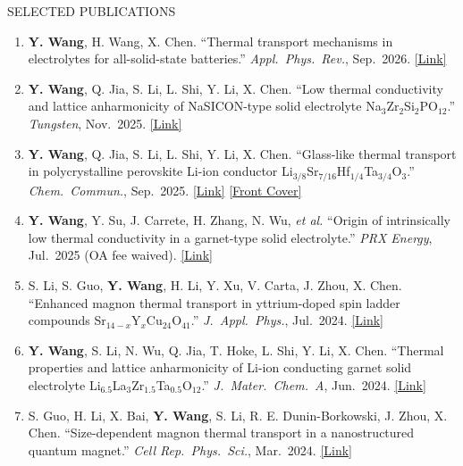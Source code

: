 \documentclass{resume} %
\begin{document}
\begin{rSection}{SELECTED PUBLICATIONS}
\begin{enumerate}
\itemsep 0.2em

\item \textbf{Y. Wang}, H. Wang, X. Chen.
``Thermal transport mechanisms in electrolytes for all-solid-state batteries.''
\textit{Appl.\ Phys.\ Rev.}, Sep.\ 2026.
\href{https://doi.org/10.1063/5.0318328}{[Link]}

\item \textbf{Y. Wang}, Q. Jia, S. Li, L. Shi, Y. Li, X. Chen.
``Low thermal conductivity and lattice anharmonicity of NaSICON-type solid electrolyte Na$_3$Zr$_2$Si$_2$PO$_{12}$.''
\textit{Tungsten}, Nov.\ 2025.
\href{https://doi.org/10.1007/s42864-025-00357-6}{[Link]}

\item \textbf{Y. Wang}, Q. Jia, S. Li, L. Shi, Y. Li, X. Chen.
``Glass-like thermal transport in polycrystalline perovskite Li-ion conductor Li$_{3/8}$Sr$_{7/16}$Hf$_{1/4}$Ta$_{3/4}$O$_3$.''
\textit{Chem.\ Commun.}, Sep.\ 2025.
\href{https://doi.org/10.1039/D5CC04693A}{[Link]}
\href{https://doi.org/10.1039/D5CC90366A}{[Front Cover]}

\item \textbf{Y. Wang}, Y. Su, J. Carrete, H. Zhang, N. Wu, \textit{et al.}
``Origin of intrinsically low thermal conductivity in a garnet-type solid electrolyte.''
\textit{PRX Energy}, Jul.\ 2025 (OA fee waived).
\href{https://doi.org/10.1103/6wj2-kzhh}{[Link]}

\item S. Li, S. Guo, \textbf{Y. Wang}, H. Li, Y. Xu, V. Carta, J. Zhou, X. Chen.
``Enhanced magnon thermal transport in yttrium-doped spin ladder compounds Sr$_{14-x}$Y$_x$Cu$_{24}$O$_{41}$.''
\textit{J.\ Appl.\ Phys.}, Jul.\ 2024.
\href{https://doi.org/10.1063/5.0214897}{[Link]}

\item \textbf{Y. Wang}, S. Li, N. Wu, Q. Jia, T. Hoke, L. Shi, Y. Li, X. Chen.
``Thermal properties and lattice anharmonicity of Li-ion conducting garnet solid electrolyte Li$_{6.5}$La$_3$Zr$_{1.5}$Ta$_{0.5}$O$_{12}$.''
\textit{J.\ Mater.\ Chem.\ A}, Jun.\ 2024.
\href{https://doi.org/10.1039/D4TA02264E}{[Link]}

\item S. Guo, H. Li, X. Bai, \textbf{Y. Wang}, S. Li, R. E. Dunin-Borkowski, J. Zhou, X. Chen.
``Size-dependent magnon thermal transport in a nanostructured quantum magnet.''
\textit{Cell Rep.\ Phys.\ Sci.}, Mar.\ 2024.
\href{https://doi.org/10.1016/j.xcrp.2024.101879}{[Link]}


\end{enumerate}
\end{rSection}
\end{document}
